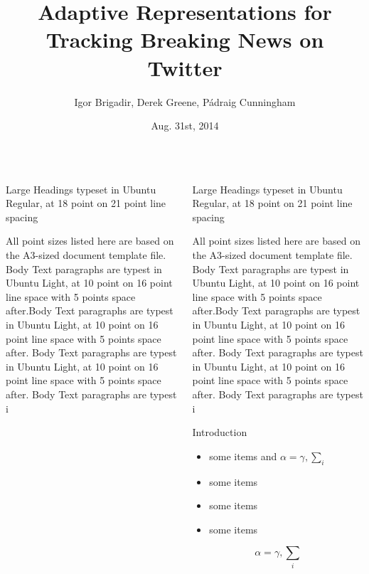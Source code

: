 \documentclass[final,hyperref={pdfpagelabels=false}]{beamer}
\title{Adaptive Representations for\\Tracking Breaking News on Twitter}
\author{Igor Brigadir, Derek Greene, P\'{a}draig Cunningham}
\institute[Insight]{Centre for\\Data Analytics}
\date{Aug. 31st, 2014}
\begin{document}
\begin{frame}{}
  

    \begin{columns}[T]
    
      
      \begin{column}{.43\paperwidth}
        \begin{block}{Large Headings typeset in Ubuntu Regular, at 18 point on 21 point line spacing}

All point sizes listed here are based on the A3-sized document template file. Body Text paragraphs are typest in Ubuntu Light, at 10 point on 16 point line space with 5 points space after.Body Text paragraphs are typest in Ubuntu Light, at 10 point on 16 point line space with 5 points space after. Body Text paragraphs are typest in Ubuntu Light, at 10 point on 16 point line space with 5 points space after. Body Text paragraphs are typest i

        \end{block}
      \end{column}
      
      
      \begin{column}{.43\paperwidth}
      
       \begin{block}{Large Headings typeset in Ubuntu Regular, at 18 point on 21 point line spacing}

All point sizes listed here are based on the A3-sized document template file. Body Text paragraphs are typest in Ubuntu Light, at 10 point on 16 point line space with 5 points space after.Body Text paragraphs are typest in Ubuntu Light, at 10 point on 16 point line space with 5 points space after. Body Text paragraphs are typest in Ubuntu Light, at 10 point on 16 point line space with 5 points space after. Body Text paragraphs are typest i

        \end{block}
      
        \begin{block}{Introduction}
          \begin{itemize}
          \item some items and $\alpha=\gamma, \sum_{i}$
          \item some items
          \item some items
          \item some items
          \end{itemize}
          $$\alpha=\gamma, \sum_{i}$$
        \end{block}


\end{column}
\end{columns}
\end{frame}
\end{document}
